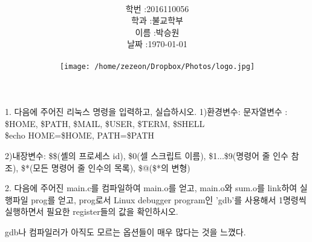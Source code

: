 \documentclass[12pt,a4paper]{article}
\title{
	\centering
	\pgfornament[width=12cm,color=teal]{84}\\
	\vspace{1cm}
	\fontsize{50}{50} \selectfont {시스템 S/W 실습9}\\
	\pgfornament[width=12cm,color=teal]{88}\\
	\vfill}
\author{
	\LARGE
	\begin{tabular}{rl}
		\hline
		학번 : & 2016110056\\ 
		학과 : & 불교학부 \\
		이름 : & 박승원\\
		날짜 : & \today\\
		\hline
	\end{tabular}\vspace{2cm}
	\\
	\texttt{[image: /home/zezeon/Dropbox/Photos/logo.jpg]}
}
\date{}
\begin{document}
\maketitle
\newpage
\noindent
\lstset{columns=flexible, tabsize=4, frame=single, showstringspaces=false, breaklines=true, upquote=true}

\lstset{language=C++}
1. 다음에 주어진 리눅스 명령을 입력하고, 실습하시오.
1)환경변수: 문자열변수 : \$HOME, \$PATH, \$MAIL, \$USER, \$TERM, \$SHELL\\
\$echo HOME=\$HOME, PATH=\$PATH

2)내장변수: \$\$(셸의 프로세스 id), \$0(셀 스크립트 이름), \$1...\$9(명령어 줄 인수 참조), \$*(모든 명령어 줄 인수의 목록), \$@(\$*의 변형)






\vspace{1cm}

2. 다음에 주어진 main.c를 컴파일하여 main.o를 얻고, main.o와 sum.o를 link하여 실행파일 prog를 얻고, prog로서 Linux debugger program인 'gdb'를 사용해서 1명령씩 실행하면서 필요한 register들의 값을 확인하시오.




{}
\indent
gdb나 컴파일러가 아직도 모르는 옵션들이 매우 많다는 것을 느꼈다.  
\end{document}

